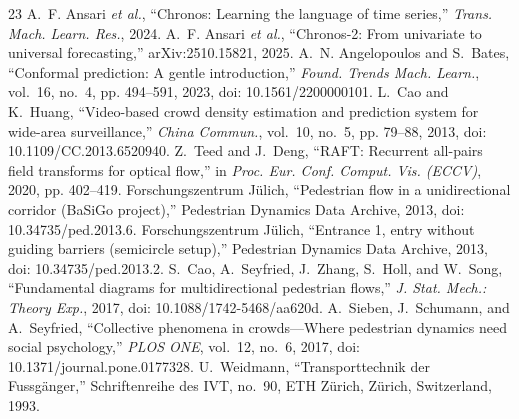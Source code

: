 \documentclass[conference]{IEEEtran}
\begin{document}
\begin{thebibliography}{23}
 A.~F. Ansari \emph{et al.}, ``Chronos: Learning the language of time series,'' \emph{Trans. Mach. Learn. Res.}, 2024.
 A.~F. Ansari \emph{et al.}, ``Chronos-2: From univariate to universal forecasting,'' arXiv:2510.15821, 2025.
 A.~N. Angelopoulos and S.~Bates, ``Conformal prediction: A gentle introduction,'' \emph{Found. Trends Mach. Learn.}, vol.~16, no.~4, pp. 494--591, 2023, doi: 10.1561/2200000101.
 L.~Cao and K.~Huang, ``Video-based crowd density estimation and prediction system for wide-area surveillance,'' \emph{China Commun.}, vol.~10, no.~5, pp. 79--88, 2013, doi: 10.1109/CC.2013.6520940.
 Z.~Teed and J.~Deng, ``RAFT: Recurrent all-pairs field transforms for optical flow,'' in \emph{Proc. Eur. Conf. Comput. Vis. (ECCV)}, 2020, pp. 402--419.
 Forschungszentrum J\"ulich, ``Pedestrian flow in a unidirectional corridor (BaSiGo project),'' Pedestrian Dynamics Data Archive, 2013, doi: 10.34735/ped.2013.6.
 Forschungszentrum J\"ulich, ``Entrance 1, entry without guiding barriers (semicircle setup),'' Pedestrian Dynamics Data Archive, 2013, doi: 10.34735/ped.2013.2.
 S.~Cao, A.~Seyfried, J.~Zhang, S.~Holl, and W.~Song, ``Fundamental diagrams for multidirectional pedestrian flows,'' \emph{J. Stat. Mech.: Theory Exp.}, 2017, doi: 10.1088/1742-5468/aa620d.
 A.~Sieben, J.~Schumann, and A.~Seyfried, ``Collective phenomena in crowds---Where pedestrian dynamics need social psychology,'' \emph{PLOS ONE}, vol.~12, no.~6, 2017, doi: 10.1371/journal.pone.0177328.
 U.~Weidmann, ``Transporttechnik der Fussg\"anger,'' Schriftenreihe des IVT, no.~90, ETH Z\"urich, Z\"urich, Switzerland, 1993.
\end{thebibliography}
\end{document}
